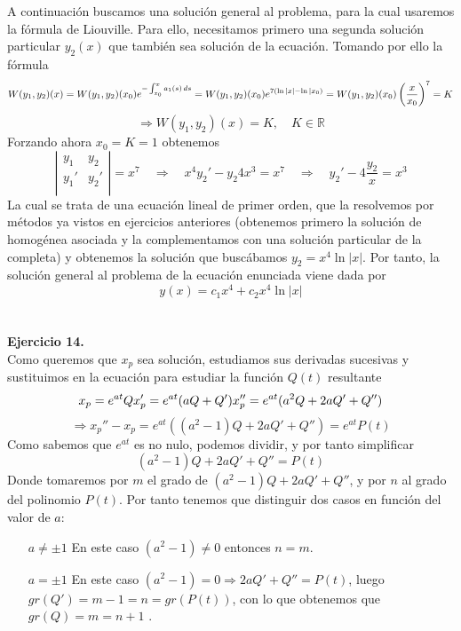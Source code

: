 \documentclass[fleqn]{article}
\def\R{\mathds{R}}
\def\next{\quad \Rightarrow \quad}
\begin{document}
    A continuación buscamos una solución general al problema, para la cual usaremos la fórmula de Liouville. Para ello, necesitamos primero una segunda
    solución particular $y_2(x)$ que también sea solución de la ecuación. Tomando por ello la fórmula
    $$W(y_1,y_2)(x) = W(y_1,y_2)(x_0) e^{-\int_{x_0}^x a_1(s)\thinspace ds} = W(y_1,y_2)(x_0) e^{7(\ln|x|-\ln|x_0)} = W(y_1,y_2)(x_0) \left(\frac{x}{x_0}\right)^7= K$$
    $$\Rightarrow W(y_1,y_2)(x) = K,\quad K\in \R$$
    Forzando ahora $x_0=K=1$ obtenemos
    $$
        \left|
        \begin{matrix}
            y_1 & y_2\\
            y_1' & y_2'\\
        \end{matrix}
        \right|=x^7 \next
        x^4y_2' - y_2 4x^3 = x^7 \next y_2' - 4\frac{y_2}{x} = x^3      
    $$
    La cual se trata de una ecuación lineal de primer orden, que la resolvemos por métodos ya vistos en ejercicios anteriores (obtenemos primero la
    solución de homogénea asociada y la complementamos con una solución particular de la completa) y obtenemos la solución que buscábamos $y_2=x^4\ln|x|$.
    Por tanto, la solución general al problema de la ecuación enunciada viene dada por 
    $$y(x)=c_1x^4 + c_2x^4\ln|x|$$\\ \\

    \textbf{Ejercicio 14.}\\

    Como queremos que $x_p$ sea solución, estudiamos sus derivadas sucesivas y sustituimos en la ecuación para estudiar la función $Q(t)$ resultante
    \begin{equation*}
        x_p=e^{at}Q\\
        x'_p=e^{at}(aQ+Q')\\
        x''_p=e^{at}(a^2Q+2aQ'+Q'')\\       
    \end{equation*} 
    $$\Rightarrow x_p''-x_p=e^{at}((a^2-1)Q+2aQ'+Q'')=e^{at}P(t)$$
    Como sabemos que $e^{at}$ es no nulo, podemos dividir, y por tanto simplificar
    $$(a^2-1)Q+2aQ'+Q''=P(t)$$
    Donde tomaremos por $m$ el grado de $(a^2-1)Q+2aQ'+Q''$, y por $n$ al grado del polinomio $P(t)$. Por tanto tenemos que distinguir dos casos en función
    del valor de $a$:
    \begin{itemize}
        \item[$a\neq \pm 1$] En este caso $(a^2-1)\neq 0$ entonces $n=m$.
        \item[$a = \pm 1$] En este caso $(a^2-1) = 0 \Rightarrow 2aQ' + Q'' = P(t)$, luego $gr(Q')=m-1=n=gr(P(t))$, con lo que obtenemos que 
                $gr(Q)=m=n+1$ .
    \end{itemize}
\end{document}

